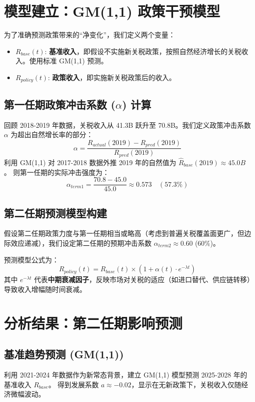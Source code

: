 \documentclass[a4paper,12pt]{article}
\begin{document}
\section{模型建立：GM(1,1) 政策干预模型}

为了准确预测政策带来的“净变化”，我们定义两个变量：
\begin{itemize}
    \item $R_{base}(t)$: \textbf{基准收入}，即假设不实施新关税政策，按照自然经济增长的关税收入。使用标准 GM(1,1) 预测。
    \item $R_{policy}(t)$: \textbf{政策收入}，即实施新关税政策后的收入。
\end{itemize}

\subsection{第一任期政策冲击系数 ($\alpha$) 计算}
回顾 2018-2019 年数据，关税收入从 41.3B 跃升至 70.8B。我们定义政策冲击系数 $\alpha$ 为超出自然增长率的部分：
\begin{equation}
    \alpha = \frac{R_{actual}(2019) - R_{pred}(2019)}{R_{pred}(2019)}
\end{equation}
利用 GM(1,1) 对 2017-2018 数据外推 2019 年的自然值为 $\hat{R}_{base}(2019) \approx 45.0B$。
则第一任期的实际冲击强度为：
\begin{equation}
    \alpha_{term1} = \frac{70.8 - 45.0}{45.0} \approx 0.573 \quad (57.3\%)
\end{equation}

\subsection{第二任期预测模型构建}
假设第二任期政策力度与第一任期相当或略高（考虑到普遍关税覆盖面更广，但边际效应递减），我们设定第二任期的预期冲击系数 $\alpha_{term2} \approx 0.60$ (60\%)。

预测模型公式为：
\begin{equation}
    R_{policy}(t) = R_{base}(t) \times (1 + \alpha(t) \cdot e^{-\lambda t})
\end{equation}
其中 $e^{-\lambda t}$ 代表\textbf{中期衰减因子}，反映市场对关税的适应（如进口替代、供应链转移）导致收入增幅随时间衰减。

\section{分析结果：第二任期影响预测}

\subsection{基准趋势预测 (GM(1,1))}
利用 2021-2024 年数据作为新常态背景，建立 GM(1,1) 模型预测 2025-2028 年的基准收入 $R_{base}$。
得到发展系数 $a \approx -0.02$，显示在无新政策下，关税收入仅随经济微幅波动。
\end{document}
